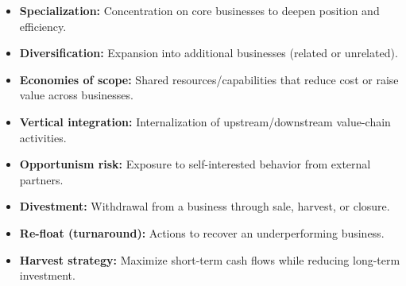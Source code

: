 \documentclass[10pt,a4paper]{article}
\begin{document}
\begin{itemize}
  \item \textbf{Specialization:} Concentration on core businesses to deepen position and efficiency.
  \item \textbf{Diversification:} Expansion into additional businesses (related or unrelated).
  \item \textbf{Economies of scope:} Shared resources/capabilities that reduce cost or raise value across businesses.
  \item \textbf{Vertical integration:} Internalization of upstream/downstream value-chain activities.
  \item \textbf{Opportunism risk:} Exposure to self-interested behavior from external partners.
  \item \textbf{Divestment:} Withdrawal from a business through sale, harvest, or closure.
  \item \textbf{Re-float (turnaround):} Actions to recover an underperforming business.
  \item \textbf{Harvest strategy:} Maximize short-term cash flows while reducing long-term investment.
\end{itemize}
\end{document}
